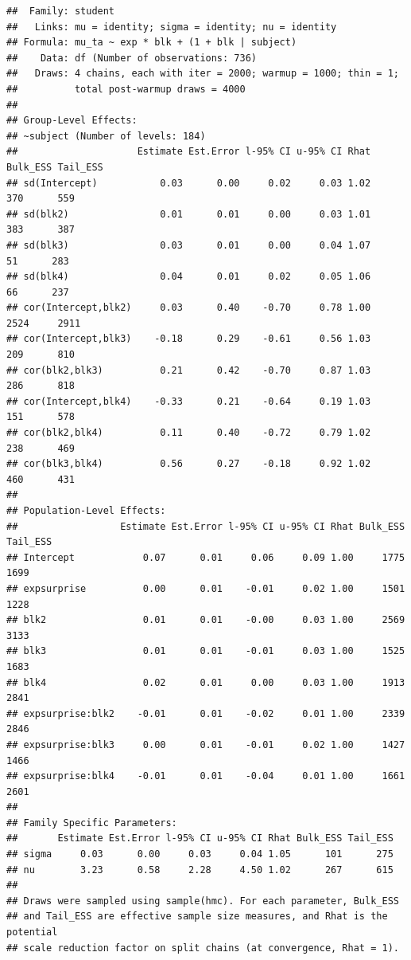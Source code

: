 \documentclass[
]{article}
\begin{document}
\begin{verbatim}
##  Family: student 
##   Links: mu = identity; sigma = identity; nu = identity 
## Formula: mu_ta ~ exp * blk + (1 + blk | subject) 
##    Data: df (Number of observations: 736) 
##   Draws: 4 chains, each with iter = 2000; warmup = 1000; thin = 1;
##          total post-warmup draws = 4000
## 
## Group-Level Effects: 
## ~subject (Number of levels: 184) 
##                     Estimate Est.Error l-95% CI u-95% CI Rhat Bulk_ESS Tail_ESS
## sd(Intercept)           0.03      0.00     0.02     0.03 1.02      370      559
## sd(blk2)                0.01      0.01     0.00     0.03 1.01      383      387
## sd(blk3)                0.03      0.01     0.00     0.04 1.07       51      283
## sd(blk4)                0.04      0.01     0.02     0.05 1.06       66      237
## cor(Intercept,blk2)     0.03      0.40    -0.70     0.78 1.00     2524     2911
## cor(Intercept,blk3)    -0.18      0.29    -0.61     0.56 1.03      209      810
## cor(blk2,blk3)          0.21      0.42    -0.70     0.87 1.03      286      818
## cor(Intercept,blk4)    -0.33      0.21    -0.64     0.19 1.03      151      578
## cor(blk2,blk4)          0.11      0.40    -0.72     0.79 1.02      238      469
## cor(blk3,blk4)          0.56      0.27    -0.18     0.92 1.02      460      431
## 
## Population-Level Effects: 
##                  Estimate Est.Error l-95% CI u-95% CI Rhat Bulk_ESS Tail_ESS
## Intercept            0.07      0.01     0.06     0.09 1.00     1775     1699
## expsurprise          0.00      0.01    -0.01     0.02 1.00     1501     1228
## blk2                 0.01      0.01    -0.00     0.03 1.00     2569     3133
## blk3                 0.01      0.01    -0.01     0.03 1.00     1525     1683
## blk4                 0.02      0.01     0.00     0.03 1.00     1913     2841
## expsurprise:blk2    -0.01      0.01    -0.02     0.01 1.00     2339     2846
## expsurprise:blk3     0.00      0.01    -0.01     0.02 1.00     1427     1466
## expsurprise:blk4    -0.01      0.01    -0.04     0.01 1.00     1661     2601
## 
## Family Specific Parameters: 
##       Estimate Est.Error l-95% CI u-95% CI Rhat Bulk_ESS Tail_ESS
## sigma     0.03      0.00     0.03     0.04 1.05      101      275
## nu        3.23      0.58     2.28     4.50 1.02      267      615
## 
## Draws were sampled using sample(hmc). For each parameter, Bulk_ESS
## and Tail_ESS are effective sample size measures, and Rhat is the potential
## scale reduction factor on split chains (at convergence, Rhat = 1).
\end{verbatim}
\end{document}
